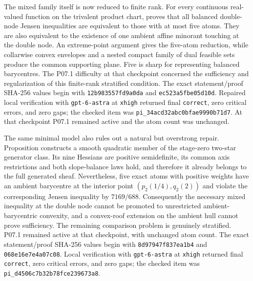 The mixed family itself is now reduced to finite rank.  For every continuous
real-valued function on the trivalent product chart,
 proves that all
balanced double-node Jensen inequalities are equivalent to those with at
most five atoms.  They are also equivalent to the existence of one ambient
affine minorant touching at the double node.  An extreme-point argument
gives the five-atom reduction, while collarwise convex envelopes and a
nested compact family of dual feasible sets produce the common supporting
plane.  Five is sharp for representing balanced barycentres.  The P07.1 difficulty at that checkpoint concerned the sufficiency and
regularization of this finite-rank stratified condition.
The exact statement/proof SHA-256 values begin with
\texttt{12b983557fd9a0da} and \texttt{ec523a5fbe05d10d}.  Repaired local
verification with \texttt{gpt-6-astra} at \texttt{xhigh} returned final
\texttt{correct}, zero critical errors, and zero gaps; the checked item was
\nolinkurl{pi_34acd32abc0bfae9990b71d7}.  At that checkpoint P07.1 remained active and the
atom count was unchanged.

The same minimal model also rules out a natural but overstrong repair.
Proposition  constructs a
smooth quadratic member of the stage-zero two-star generator class.  Its
nine Hessians are positive semidefinite, its common axis restrictions and
both slope-balance laws hold, and therefore it already belongs to the full
generated sheaf.  Nevertheless, five exact atoms with positive weights have
an ambient barycentre at the interior point
\((p_2(1/4),q_2(2))\) and violate the corresponding Jensen inequality by
\(7169/688\).  Consequently the necessary mixed inequality at the double
node cannot be promoted to unrestricted ambient-barycentric convexity, and
a convex-roof extension on the ambient hull cannot prove sufficiency.
The remaining comparison problem is genuinely stratified.  P07.1 remained active at that checkpoint, with unchanged atom count.  The exact statement/proof SHA-256
values begin with \texttt{8d97947f837ea1b4} and
\texttt{068e16e7e4a07c08}.  Local verification with
\texttt{gpt-6-astra} at \texttt{xhigh} returned final \texttt{correct},
zero critical errors, and zero gaps; the checked item was
\nolinkurl{pi_d4506c7b32b78fce239673a8}.

